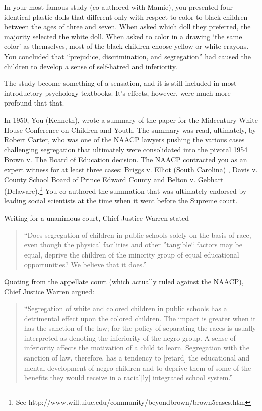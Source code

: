 In your most famous study (co-authored with Mamie), you presented four identical plastic dolls that different only with respect to color to black children between the ages of three and seven. When asked which doll they preferred, the majority selected the white doll. When asked to color in a drawing `the same color' as themselves, most of the black children choose yellow or white crayons. You concluded that ``prejudice, discrimination, and segregation'' had caused the children to develop a sense of self-hatred and inferiority.

The study become something of a sensation, and it is still included in most introductory psychology textbooks. It's effects, however, were much more profound that that.

In 1950, You (Kenneth), wrote a summary of the paper for the Midcentury White House Conference on Children and Youth. The summary was read, ultimately, by Robert Carter, who was one of the NAACP lawyers pushing the various cases challenging segregation that ultimately were consolidated into the pivotal 1954 Brown v. The Board of Education decision. The NAACP contracted you as an expert witness for at least three cases: Briggs v. Elliot (South Carolina) , Davis v. County School Board of Prince Edward County and Belton v. Gebhart (Delaware).\footnote{See http:\slash \slash www.will.uiuc.edu\slash community\slash beyondbrown\slash brown5cases.htm} You co-authored the summation that was ultimately endorsed by leading social scientists at the time when it went before the Supreme court.

Writing for a unanimous court, Chief Justice Warren stated

\begin{quote}

``Does segregation of children in public schools solely on the basis of race, even though the physical facilities and other ''tangible`` factors may be equal, deprive the children of the minority group of equal educational opportunities? We believe that it does.''
\end{quote}

Quoting from the appellate court (which actually ruled against the NAACP), Chief Justice Warren argued:

\begin{quote}

``Segregation of white and colored children in public schools has a detrimental effect upon the colored children. The impact is greater when it has the sanction of the law; for the policy of separating the races is usually interpreted as denoting the inferiority of the negro group. A sense of inferiority affects the motivation of a child to learn. Segregation with the sanction of law, therefore, has a tendency to [retard] the educational and mental development of negro children and to deprive them of some of the benefits they would receive in a racial[ly] integrated school system.'' 
\end{quote}

